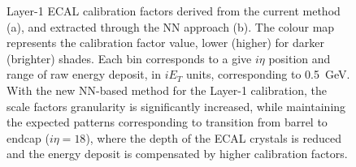 \begin{figure}
    \centering
    \caption{Layer-1 ECAL calibration factors derived from the current method (a), and extracted through the NN approach (b). The colour map represents the calibration factor value, lower (higher) for darker (brighter) shades. Each bin corresponds to a give $i\eta$ position and range of raw energy deposit, in $iE_T$ units, corresponding to 0.5~GeV. With the new NN-based method for the Layer-1 calibration, the scale factors granularity is significantly increased, while maintaining the expected patterns corresponding to transition from barrel to endcap ($i\eta=18$), where the depth of the ECAL crystals is reduced and the energy deposit is compensated by higher calibration factors.}
    \label{fig:ECALSFs_NN}
\end{figure}

